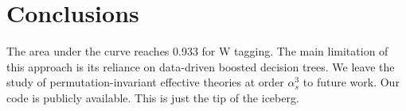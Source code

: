 \section{Conclusions}\label{sec:conclusions}

The area under the curve reaches 0.933 for W tagging. The main
limitation of this approach is its reliance on data-driven boosted
decision trees. We leave the study of permutation-invariant effective
theories at order $\alpha_s^3$ to future work. Our code is publicly
available. This is just the tip of the iceberg.

